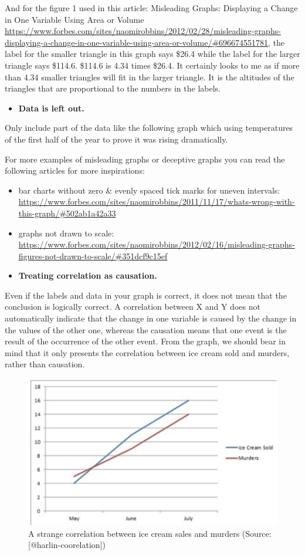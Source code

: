 \documentclass[]{book}
\providecommand{\tightlist}{%
  \setlength{\itemsep}{0pt}\setlength{\parskip}{0pt}}
\theoremstyle{definition}
\theoremstyle{definition}
\theoremstyle{definition}
\theoremstyle{remark}
\begin{document}
And for the figure 1 used in this article: Misleading Graphs: Displaying
a Change in One Variable Using Area or Volume
\url{https://www.forbes.com/sites/naomirobbins/2012/02/28/misleading-graphs-displaying-a-change-in-one-variable-using-area-or-volume/\#696674551781},
the label for the smaller triangle in this graph says \$26.4 while the
label for the larger triangle says \$114.6. \$114.6 is 4.34 times
\$26.4. It certainly looks to me as if more than 4.34 smaller triangles
will fit in the larger triangle. It is the altitudes of the triangles
that are proportional to the numbers in the labels.

\begin{itemize}
\tightlist
\item
  \textbf{Data is left out.}
\end{itemize}

Only include part of the data like the following graph which using
temperatures of the first half of the year to prove it was rising
dramatically.

For more examples of misleading graphs or deceptive graphs you can read
the following articles for more inspirations:

\begin{itemize}
\item
  bar charts without zero \& evenly spaced tick marks for uneven
  intervals:
  \url{https://www.forbes.com/sites/naomirobbins/2011/11/17/whats-wrong-with-this-graph/\#502ab1a42a33}
\item
  graphs not drawn to scale:
  \url{https://www.forbes.com/sites/naomirobbins/2012/02/16/misleading-graphs-figures-not-drawn-to-scale/\#351dcf9c15ef}
\item
  \textbf{Treating correlation as causation.}
\end{itemize}

Even if the labels and data in your graph is correct, it does not mean
that the conclusion is logically correct. A correlation between X and Y
does not automatically indicate that the change in one variable is
caused by the change in the values of the other one, whereas the
causation means that one event is the result of the occurrence of the
other event. From the graph, we should bear in mind that it only
presents the correlation between ice cream sold and murders, rather than
causation.

\begin{figure}
\includegraphics[width=0.7\linewidth]{images/harlin-ice-cream} \caption{A strange correlation between ice cream sales and murders (Source: [@harlin-coorelation])}\label{fig:harlin-ice-cream}
\end{figure}
\end{document}
